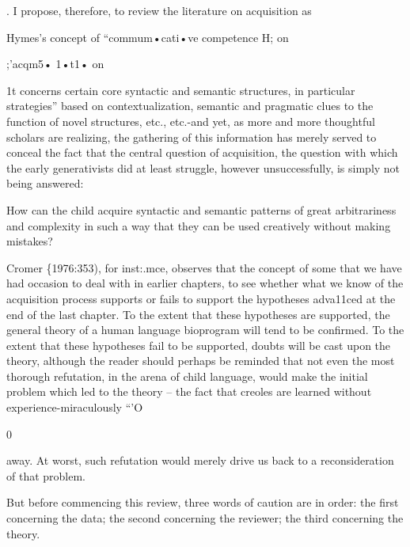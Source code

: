 . I propose, therefore, to review the literature on acquisition as

Hymes's concept of ``commum•cati•ve competence H; on

;'acqm5• 1•t1• on

1t concerns certain core syntactic and semantic structures, in particular
strategies'' based on contextualization, semantic and pragmatic clues to the function of novel structures, etc., etc.-and yet, as more and more thoughtful scholars are realizing, the gathering of this information has merely served to conceal the fact that the central question of acquisition, the question with which the early generativists did at least struggle, however unsuccessfully, is simply not being answered:

How can the child acquire syntactic and semantic patterns of great arbitrariness and complexity in such a way that they can be used creatively without making mistakes?

Cromer \{1976:353), for inst:.mce, observes that the concept of
some that we have had occasion to deal with in earlier chapters, to see whether what we know of the acquisition process supports or fails to support the hypotheses adva11ced at the end of the last chapter. To the extent that these hypotheses are supported, the general theory of a human language bioprogram will tend to be confirmed. To the
extent that these hypotheses fail to be supported, doubts will be cast upon the theory, although the reader should perhaps be reminded that not even the most thorough refutation, in the arena of child language, would make the initial problem which led to the theory --
the fact that creoles are learned without experience-miraculously ``'O

0

away. At worst, such refutation would merely drive us back to a
reconsideration of that problem.


But before commencing this review, three words of caution are in order: the first concerning the data; the second concerning the reviewer; the third concerning the theory.

